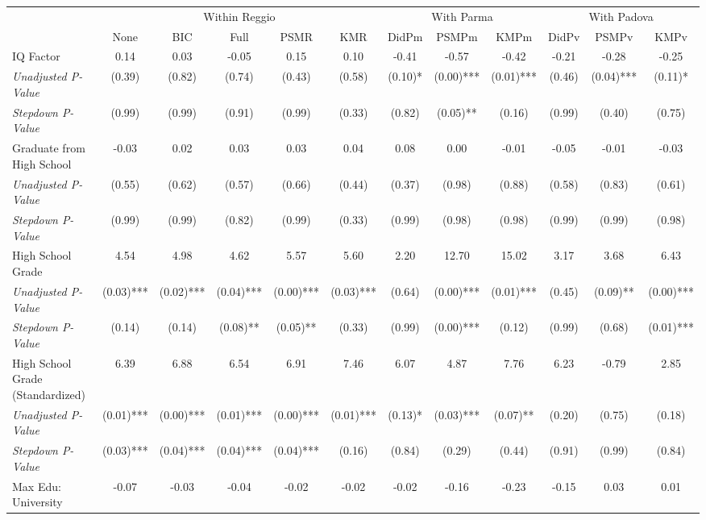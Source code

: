 \begin{tabular}{l c c c c c c c c c c c}
\toprule
& \multicolumn{5}{c}{Within Reggio} & \multicolumn{3}{c}{With Parma} & \multicolumn{3}{c}{With Padova} \\\cmidrule(lr){2-6} \cmidrule(lr){7-9} \cmidrule(lr){10-12}
 & None & BIC & Full & PSMR & KMR & DidPm & PSMPm & KMPm & DidPv & PSMPv & KMPv \\
\midrule
IQ Factor & 0.14 & 0.03 & -0.05 & 0.15 & 0.10 & -0.41 & -0.57 & -0.42 & -0.21 & -0.28 & -0.25 \\
\quad \textit{Unadjusted P-Value} & (0.39) & (0.82) & (0.74) & (0.43) & (0.58) & (0.10)* & (0.00)*** & (0.01)*** & (0.46) & (0.04)*** & (0.11)* \\
\quad \textit{Stepdown P-Value} & (0.99) & (0.99) & (0.91) & (0.99) & (0.33) & (0.82) & (0.05)** & (0.16) & (0.99) & (0.40) & (0.75) \\
Graduate from High School & -0.03 & 0.02 & 0.03 & 0.03 & 0.04 & 0.08 & 0.00 & -0.01 & -0.05 & -0.01 & -0.03 \\
\quad \textit{Unadjusted P-Value} & (0.55) & (0.62) & (0.57) & (0.66) & (0.44) & (0.37) & (0.98) & (0.88) & (0.58) & (0.83) & (0.61) \\
\quad \textit{Stepdown P-Value} & (0.99) & (0.99) & (0.82) & (0.99) & (0.33) & (0.99) & (0.98) & (0.98) & (0.99) & (0.99) & (0.98) \\
High School Grade & 4.54 & 4.98 & 4.62 & 5.57 & 5.60 & 2.20 & 12.70 & 15.02 & 3.17 & 3.68 & 6.43 \\
\quad \textit{Unadjusted P-Value} & (0.03)*** & (0.02)*** & (0.04)*** & (0.00)*** & (0.03)*** & (0.64) & (0.00)*** & (0.01)*** & (0.45) & (0.09)** & (0.00)*** \\
\quad \textit{Stepdown P-Value} & (0.14) & (0.14) & (0.08)** & (0.05)** & (0.33) & (0.99) & (0.00)*** & (0.12) & (0.99) & (0.68) & (0.01)*** \\
High School Grade (Standardized) & 6.39 & 6.88 & 6.54 & 6.91 & 7.46 & 6.07 & 4.87 & 7.76 & 6.23 & -0.79 & 2.85 \\
\quad \textit{Unadjusted P-Value} & (0.01)*** & (0.00)*** & (0.01)*** & (0.00)*** & (0.01)*** & (0.13)* & (0.03)*** & (0.07)** & (0.20) & (0.75) & (0.18) \\
\quad \textit{Stepdown P-Value} & (0.03)*** & (0.04)*** & (0.04)*** & (0.04)*** & (0.16) & (0.84) & (0.29) & (0.44) & (0.91) & (0.99) & (0.84) \\
Max Edu: University & -0.07 & -0.03 & -0.04 & -0.02 & -0.02 & -0.02 & -0.16 & -0.23 & -0.15 & 0.03 & 0.01 \\

\end{tabular}
